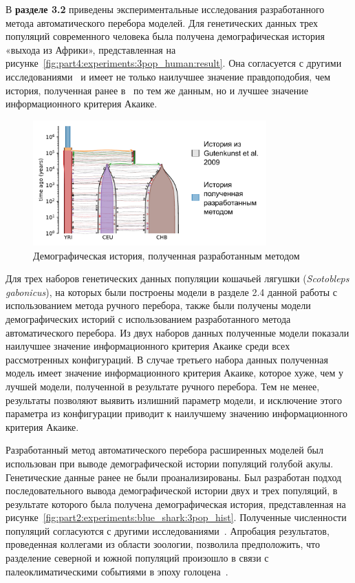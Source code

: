 В \textbf{разделе 3.2} приведены экспериментальные исследования разработанного метода автоматического перебора моделей.
Для генетических данных трех популяций современного человека была получена демографическая история «выхода из Африки», представленная на рисунке~\ref{fig:part4:experiments:3pop_human:result}.
Она согласуется с другими исследованиями~\cite{gutenkunst2009inferring, schraiber2015methods, nielsen2007recent} и имеет не только наилучшее значение правдоподобия, чем история, полученная ранее в~\cite{gutenkunst2009inferring} по тем же данным, но и лучшее значение информационного критерия Акаике.

\begin{figure}[ht]
    \centering
        \includegraphics[width=0.8\textwidth]{images_experiments/3pop_human_gutenkunst/picture_3pop_result.pdf}
    \caption{Демографическая история, полученная разработанным методом}
\end{figure}

Для трех наборов генетических данных популяции кошачьей лягушки (\textit{Scotobleps gabonicus}), на которых были построены модели в разделе 2.4 данной работы с использованием метода ручного перебора, также были получены модели демографических историй с использованием разработанного метода автоматического перебора.
Из двух наборов данных полученные модели показали наилучшее значение информационного критерия Акаике среди всех рассмотренных конфигураций.
В случае третьего набора данных полученная модель имеет значение информационного критерия Акаике, которое хуже, чем у лучшей модели, полученной в результате ручного перебора. Тем не менее, результаты позволяют выявить излишний параметр модели, и исключение этого параметра из конфигурации приводит к наилучшему значению информационного критерия Акаике.

Разработанный метод автоматического перебора расширенных моделей был использован при выводе демографической истории популяций голубой акулы.
Генетические данные ранее не были проанализированы.
Был разработан подход последовательного вывода демографической истории двух и трех популяций, в результате которого была получена демографическая история, представленная на рисунке~\ref{fig:part2:experiments:blue_shark:3pop_hist}.
Полученные численности популяций согласуются с другими исследованиями~\cite{king2015genetic,verissimo2017world}.
Апробация результатов, проведенная коллегами из области зоологии, позволила предположить, что разделение северной и южной популяций произошло в связи с палеоклиматическими событиями в эпоху голоцена~\cite{leduc2010holocene,masson2013information,olsen2012variability}.

